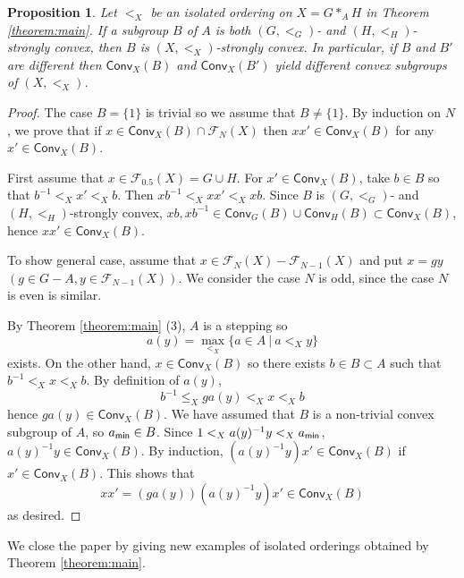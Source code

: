 \documentclass[10pt]{amsart}
\newtheorem{proposition}[theorem]{Proposition}
\numberwithin{equation}{section}
\begin{document}
\begin{proposition}
\label{prop:convex}
Let $<_{X}$ be an isolated ordering on $X=G*_{A}H$ in Theorem \ref{theorem:main}.
If a subgroup $B$ of $A$ is both $(G,<_{G})$- and $(H,<_{H})$-strongly convex, then $B$ is $(X,<_{X})$-strongly convex. In particular, if $B$ and $B'$ are different then ${\mathsf{Conv}}_{X}(B)$ and ${\mathsf{Conv}}_{X}(B')$ yield different convex subgroups of $(X,<_{X})$.
\end{proposition}
\begin{proof}

The case $B=\{1\}$ is trivial so we assume that $B \neq \{1\}$.
By induction on $N$, we prove that if $x \in {\mathsf{Conv}}_{X}(B) \cap {\mathcal{F}}_{N}(X)$ then $xx' \in {\mathsf{Conv}}_{X}(B)$ for any $x' \in {\mathsf{Conv}}_{X}(B)$.

First assume that $x \in {\mathcal{F}}_{0.5}(X) = G\cup H$.
For $x' \in {\mathsf{Conv}}_{X}(B)$, take $b \in B$ so that $b^{-1} <_{X} x' <_{X} b$. 
Then $xb^{-1} <_{X} xx' <_{X} xb$. Since $B$ is $(G,<_{G})$- and $(H,<_{H})$-strongly convex, $xb,xb^{-1} \in {\mathsf{Conv}}_{G}(B) \cup {\mathsf{Conv}}_{H}(B) \subset {\mathsf{Conv}}_{X}(B)$, hence $xx' \in {\mathsf{Conv}}_{X}(B)$.

To show general case, assume that $x \in {\mathcal{F}}_{N}(X)-{\mathcal{F}}_{N-1}(X)$ and put $x = gy$ $(g \in G-A, y \in {\mathcal{F}}_{N-1}(X))$. We consider the case $N$ is odd, since the case $N$ is even is similar.

By Theorem \ref{theorem:main} (3), $A$ is a stepping so 
\[ a(y)= \max_{<_{X}}\{a \in A \: |\: a<_{X} y\} \]
exists. On the other hand, $x \in {\mathsf{Conv}}_{X}(B)$ so there exists $b \in B \subset A$ such that $b^{-1} <_{X} x <_{X} b$. By definition of $a(y)$, 
\[ b^{-1} \leq_{X} g a(y) <_{X} x <_{X} b\]
hence $ga(y) \in {\mathsf{Conv}}_{X}(B)$. We have assumed that $B$ is a non-trivial convex subgroup of $A$, so $a_{\sf min} \in B$. Since $1 <_{X} a(y)^{-1}y <_{X} a_{\sf min} $, $a(y)^{-1}y \in {\mathsf{Conv}}_{X}(B)$. By induction, $(a(y)^{-1}y)x' \in {\mathsf{Conv}}_{X}(B)$ if $x' \in {\mathsf{Conv}}_{X}(B)$. This shows that 
\[ x x'= (ga(y))(a(y)^{-1}y)x' \in {\mathsf{Conv}}_{X}(B) \]
as desired.
\end{proof}

We close the paper by giving new examples of isolated orderings obtained by Theorem \ref{theorem:main}.
\end{document}
